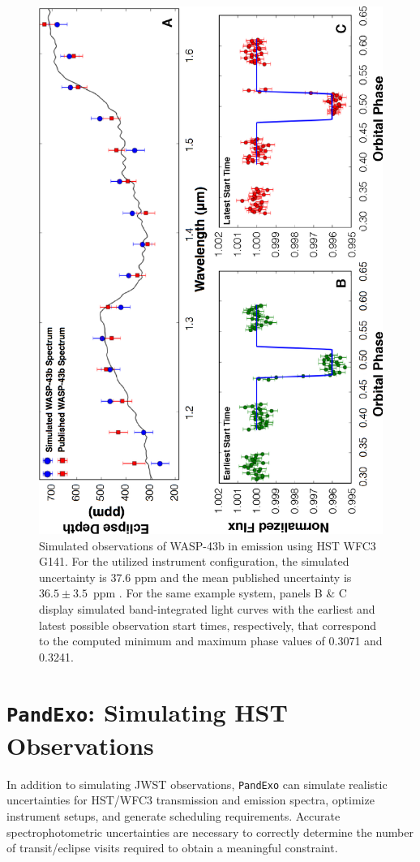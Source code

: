 \documentclass[iop]{emulateapj}
\begin{document}
\begin{figure}[ht]
\centering
 \includegraphics[angle=270,origin=c,width=6in]{fig9.eps}
\caption{Simulated observations of WASP-43b in emission using HST WFC3 G141. For the utilized instrument configuration, the simulated uncertainty is 37.6 ppm and the mean published uncertainty is $36.5 {\pm} 3.5$~ppm \citep{Stevenson2014c}. For the same example system, panels B \& C display simulated band-integrated light curves with the earliest and latest possible observation start times, respectively, that correspond to the computed minimum and maximum phase values of 0.3071 and 0.3241.\label{fig9}}
\end{figure}
\section{\texttt{PandExo}: Simulating HST Observations}
In addition to simulating JWST observations, \texttt{PandExo} can simulate realistic uncertainties for HST/WFC3 transmission and emission spectra, optimize instrument setups, and generate scheduling requirements.  Accurate spectrophotometric uncertainties are necessary to correctly determine the number of transit/eclipse visits required to obtain a meaningful constraint.
\end{document}
